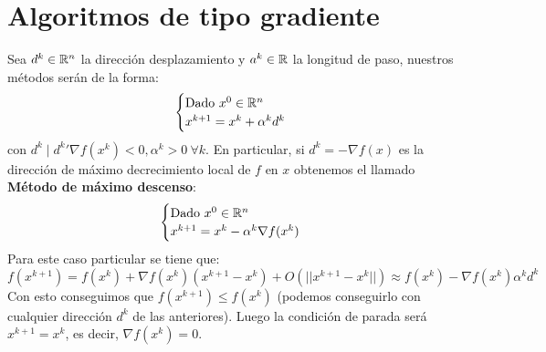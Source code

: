 \documentclass[MIOP.tex]{subfiles}
\begin{document}
\section{Algoritmos de tipo gradiente}
Sea $d^k \in\mathbb{R}^n$ la dirección desplazamiento y $a^k \in \mathbb{R}$ la longitud de paso, nuestros métodos serán de la forma:
\[
\begin{cases}
\text{Dado $x^0\in \mathbb{R}^n$}\\
x^{k+1} = x^k + \alpha^k d^k
\end{cases}
\]
con $d^k\mid {d^k}'\nabla f(x^k)<0, \alpha^k>0\ \forall k$. En particular, si $d^k=-\nabla f(x)$ es la dirección de máximo decrecimiento local de $f$ en $x$ obtenemos el llamado \textbf{Método de máximo descenso}:
\[
\begin{cases}
\text{Dado $x^0\in \mathbb{R}^n$}\\
x^{k+1} = x^k - \alpha^k \nabla f(x^k)
\end{cases}
\]
Para este caso particular se tiene que:
\[
f(x^{k+1})=f(x^k)+\nabla f(x^k)(x^{k+1}-x^k) + O(||x^{k+1}-x^k||) \approx f(x^k)-\nabla f(x^k)\alpha^k d^k
\]
Con esto conseguimos que $f(x^{k+1})\leq f(x^k)$ (podemos conseguirlo con cualquier dirección $d^k$ de las anteriores). Luego la condición de parada será $x^{k+1}=x^k$, es decir, $\nabla f(x^k)=0$. 
\end{document}
